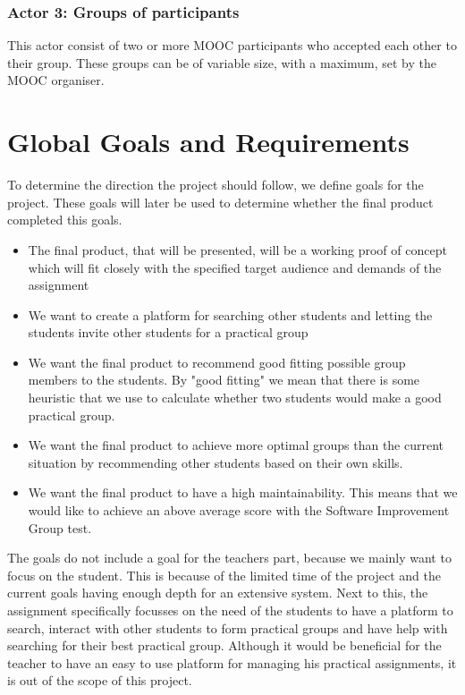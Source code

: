 \subsubsection{Actor 3: Groups of participants}
This actor consist of two or more MOOC participants who accepted each other to their group.
These groups can be of variable size, with a maximum, set by the MOOC organiser.

\section{Global Goals and Requirements}
To determine the direction the project should follow, we define goals for the project.
These goals will later be used to determine whether the final product completed this goals.
\begin{itemize}
\item The final product, that will be presented, will be a working proof of concept which will fit closely with the specified target audience and demands of the assignment
\item We want to create a platform for searching other students and letting the students invite other students for a practical group
\item We want the final product to recommend good fitting possible group members to the students. By "good fitting" we mean that there is some heuristic that we use to calculate whether two students would make a good practical group.
\item We want the final product to achieve more optimal groups than the current situation by recommending other students based on their own skills.
\item We want the final product to have a high maintainability.
This means that we would like to achieve an above average score with the Software Improvement Group test.
\end{itemize}

The goals do not include a goal for the teachers part, because we mainly want to focus on the student.
This is because of the limited time of the project and the current goals having enough depth for an extensive system.
Next to this, the assignment specifically focusses on the need of the students to have a platform to search, interact with other students to form practical groups and have help with searching for their best practical group.
Although it would be beneficial for the teacher to have an easy to use platform for managing his practical assignments, it is out of the scope of this project.

